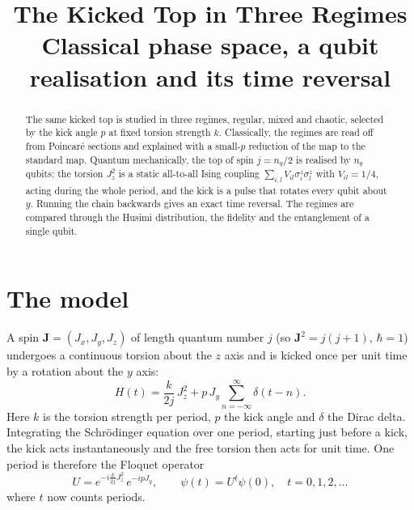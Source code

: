 \documentclass[11pt,a4paper]{article}
\title{The Kicked Top in Three Regimes\\[0.3em]
  \large Classical phase space, a qubit realisation and its time reversal}
\author{}
\date{}
\begin{document}
\maketitle

\begin{abstract}
The same kicked top is studied in three regimes, regular, mixed and chaotic, selected by the kick angle $p$ at
fixed torsion strength $k$. Classically, the regimes are read off from Poincar\'e sections and explained with a
small-$p$ reduction of the map to the standard map. Quantum mechanically, the top of spin $j=n_q/2$ is realised by
$n_q$ qubits: the torsion $J_z^2$ is a static all-to-all Ising coupling $\sum_{i,l}V_{il}\sigma^z_i\sigma^z_l$ with
$V_{il}=1/4$, acting during the whole period, and the kick is a pulse that rotates every qubit about $y$. Running the
chain backwards gives an exact time reversal. The regimes are compared through the Husimi distribution, the fidelity
and the entanglement of a single qubit.
\end{abstract}

\tableofcontents

\section{The model}\label{sec:model}

A spin $\bm J=(J_x,J_y,J_z)$ of length quantum number $j$ (so $\bm J^2=j(j+1)$, $\hbar=1$) undergoes a continuous
torsion about the $z$ axis and is kicked once per unit time by a rotation about the $y$ axis:
\begin{equation}\label{eq:H}
  H(t) = \frac{k}{2j}\,J_z^2 + p\,J_y\sum_{n=-\infty}^{\infty}\delta(t-n).
\end{equation}
Here $k$ is the torsion strength per period, $p$ the kick angle and $\delta$ the Dirac delta. Integrating the
Schr\"odinger equation over one period, starting just before a kick, the kick acts instantaneously and the free
torsion then acts for unit time. One period is therefore the Floquet operator
\begin{equation}\label{eq:U}
  U = e^{-i\frac{k}{2j}J_z^2}\,e^{-ipJ_y},\qquad \psi(t) = U^t\psi(0),\quad t=0,1,2,\dots
\end{equation}
where $t$ now counts periods.
\end{document}
